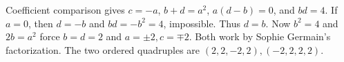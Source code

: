 Coefficient comparison gives $c=-a$, $b+d=a^2$, $a(d-b)=0$, and $bd=4$. If $a=0$, then $d=-b$ and $bd=-b^2=4$, impossible. Thus $d=b$. Now $b^2=4$ and $2b=a^2$ force $b=d=2$ and $a=\pm2,c=\mp2$. Both work by Sophie Germain's factorization. The two ordered quadruples are $\boxed{(2,2,-2,2),(-2,2,2,2)}$.
